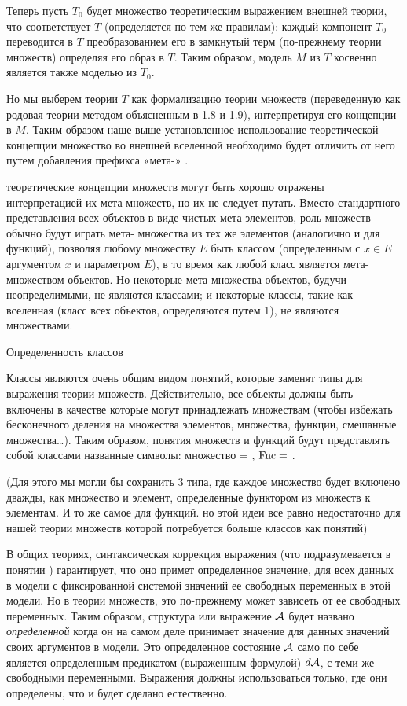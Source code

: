 Теперь пусть $T_0$ будет множество теоретическим выражением внешней теории, что соответствует $T$ (определяется по тем же правилам): каждый компонент $T_0$ переводится в $T$ преобразованием его в замкнутый терм (по-прежнему теории множеств) определяя его образ в $T$. 
Таким образом, модель $M$ из $T$ косвенно является также моделью из $T_0$. 

Но мы выберем теории $T$ как формализацию теории множеств (переведенную как родовая теории методом объясненным в 1.8 и 1.9), интерпретируя его концепции в $M$. Таким образом наше выше установленное использование теоретической концепции множество во внешней вселенной необходимо будет отличить от него путем добавления префикса «мета-» .

теоретические концепции множеств могут быть хорошо отражены интерпретацией их мета-множеств, но их не следует путать. Вместо стандартного представления всех объектов в виде чистых мета-элементов, роль множеств  обычно будут играть мета- множества из тех же элементов (аналогично и для функций), позволяя любому множеству $E$ быть классом (определенным с $x\in E$  аргументом $x$ и параметром $E$), в то время как любой класс является мета-множеством объектов. Но некоторые мета-множества объектов, будучи неопределимыми, не являются классами; и некоторые классы, такие как вселенная (класс всех объектов, определяются путем 1), не являются множествами. 

{\sst Определенность классов}

Классы являются очень общим видом понятий, которые заменят типы для выражения теории множеств. Действительно, все объекты должны быть включены в качестве  которые могут принадлежать множествам (чтобы избежать бесконечного деления на множества элементов, множества, функции, смешанные множества\dots). Таким образом, понятия множеств и функций будут представлять собой классами названные символы: множество = , $\mathop{\rm Fnc} =$ .

(Для этого мы могли бы сохранить 3 типа, где каждое множество будет включено дважды, как множество и элемент, определенные функтором из множеств к элементам. И то же самое для функций. но этой идеи все равно недостаточно для нашей теории множеств которой потребуется больше классов как понятий)

В общих теориях, синтаксическая коррекция выражения (что подразумевается в понятии ) гарантирует, что оно примет определенное значение, для всех данных в модели с фиксированной системой значений ее свободных переменных в этой модели. Но в теории множеств, это по-прежнему может зависеть от ее свободных переменных. Таким образом, структура или выражение ${\cal A}$ будет названо {\it определенной} когда он на самом деле принимает значение для данных значений своих аргументов в модели. Это определенное состояние ${\cal A} $ само по себе является определенным предикатом (выраженным формулой) $d{\cal A}$, с теми же свободными переменными. Выражения должны использоваться только, где они определены, что и будет сделано естественно. 

